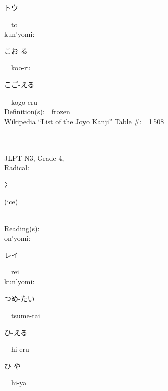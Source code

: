 \begin{multicols}{2}
{\hspace*{2em}}{\begin{CJK}{UTF8}{min} トウ \end{CJK}}\ \ t\=o\ \ \\
{\hspace*{1em}}kun'yomi:\ \ \\
{\hspace*{2em}}{\begin{CJK}{UTF8}{min} こお-る \end{CJK}}\ \ koo-ru\ \ \\
{\hspace*{2em}}{\begin{CJK}{UTF8}{min} こご-える \end{CJK}}\ \ kogo-eru\ \ \\
Definition(s):\ \ frozen \\
Wikipedia ``List of the J\=oy\=o Kanji'' Table \#:\ \ 1\,508 \\
\ \ \\
{\fontsize{34pt}{40pt}  }\ \ \\  %
{JLPT N3, Grade 4, \\Radical:\ \ {\begin{CJK}{UTF8}{min} 冫 \end{CJK}} (ice) } \\
Reading(s):\ \ \\
{\hspace*{1em}}on'yomi:\ \ \\
{\hspace*{2em}}{\begin{CJK}{UTF8}{min} レイ \end{CJK}}\ \ rei\ \ \\
{\hspace*{1em}}kun'yomi:\ \ \\
{\hspace*{2em}}{\begin{CJK}{UTF8}{min} つめ-たい \end{CJK}}\ \ tsume-tai\ \ \\
{\hspace*{2em}}{\begin{CJK}{UTF8}{min} ひ-える \end{CJK}}\ \ hi-eru\ \ \\
{\hspace*{2em}}{\begin{CJK}{UTF8}{min} ひ-や \end{CJK}}\ \ hi-ya\ \ \\

\end{multicols}
